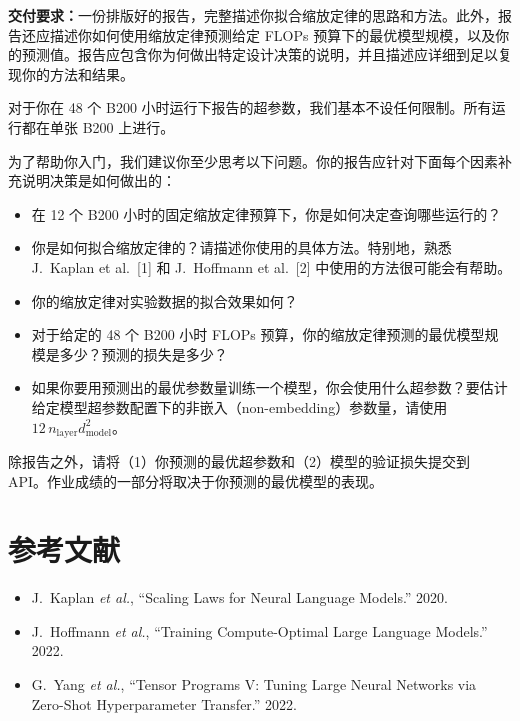 \textbf{交付要求：}一份排版好的报告，完整描述你拟合缩放定律的思路和方法。此外，报告还应描述你如何使用缩放定律预测给定 FLOPs 预算下的最优模型规模，以及你的预测值。报告应包含你为何做出特定设计决策的说明，并且描述应详细到足以复现你的方法和结果。

对于你在 48 个 B200 小时运行下报告的超参数，我们基本不设任何限制。所有运行都在单张 B200 上进行。

为了帮助你入门，我们建议你至少思考以下问题。你的报告应针对下面每个因素补充说明决策是如何做出的：

\begin{itemize}
  \item 在 12 个 B200 小时的固定缩放定律预算下，你是如何决定查询哪些运行的？
  \item 你是如何拟合缩放定律的？请描述你使用的具体方法。特别地，熟悉 J.~Kaplan et al.~[1] 和 J.~Hoffmann et al.~[2] 中使用的方法很可能会有帮助。
  \item 你的缩放定律对实验数据的拟合效果如何？
  \item 对于给定的 48 个 B200 小时 FLOPs 预算，你的缩放定律预测的最优模型规模是多少？预测的损失是多少？
  \item 如果你要用预测出的最优参数量训练一个模型，你会使用什么超参数？要估计给定模型超参数配置下的非嵌入（non-embedding）参数量，请使用 $12\,n_{\mathrm{layer}} d_{\mathrm{model}}^2$。
\end{itemize}

除报告之外，请将（1）你预测的最优超参数和（2）模型的验证损失提交到 API。作业成绩的一部分将取决于你预测的最优模型的表现。

\section*{参考文献}

\begin{itemize}
  \item [{[1]}] J.~Kaplan \textit{et al.}, ``Scaling Laws for Neural Language Models.'' 2020.
  \item [{[2]}] J.~Hoffmann \textit{et al.}, ``Training Compute-Optimal Large Language Models.'' 2022.
  \item [{[3]}] G.~Yang \textit{et al.}, ``Tensor Programs V: Tuning Large Neural Networks via Zero-Shot Hyperparameter Transfer.'' 2022.
\end{itemize}
